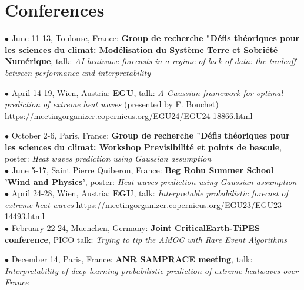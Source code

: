 \documentclass[11pt, a4 paper]{article}
\newcommand{\bu}{$\bullet$ }
\begin{document}
\section*{Conferences}
  \begin{description}[style=multiline,leftmargin=3cm,align=right]
    \item[2025]
      \bu June 11-13, Toulouse, France: \textbf{Group de recherche "Défis théoriques pour les sciences du climat: Modélisation du Système Terre et Sobriété Numérique}, talk: \emph{AI heatwave forecasts in a regime of lack of data: the tradeoff between performance and interpretability}
    \item[2024]
      \bu April 14-19, Wien, Austria: \textbf{EGU}, talk: \emph{A Gaussian framework for optimal prediction of extreme heat waves} (presented by F. Bouchet) \url{https://meetingorganizer.copernicus.org/EGU24/EGU24-18866.html}
    \item[2023]
      \bu October 2-6, Paris, France: \textbf{Group de recherche "Défis théoriques pour les sciences du climat: Workshop Previsibilité et points de bascule}, poster: \emph{Heat waves prediction using Gaussian assumption} \\
      \bu June 5-17, Saint Pierre Quiberon, France: \textbf{Beg Rohu Summer School 'Wind and Physics'}, poster: \emph{Heat waves prediction using Gaussian assumption} \\
      \bu April 24-28, Wien, Austria: \textbf{EGU}, talk: \emph{Interpretable probabilistic forecast of extreme heat waves} \url{https://meetingorganizer.copernicus.org/EGU23/EGU23-14493.html} \\
      \bu February 22-24, Muenchen, Germany: \textbf{Joint CriticalEarth-TiPES conference}, PICO talk: \emph{Trying to tip the AMOC with Rare Event Algorithms}
    \item[2022]
      \bu December 14, Paris, France: \textbf{ANR SAMPRACE meeting}, talk: \emph{Interpretability of deep learning probabilistic prediction of extreme heatwaves over France}
  \end{description}
\end{document}

